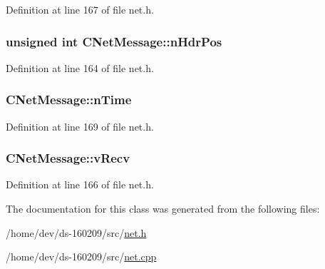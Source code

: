 Definition at line 167 of file net.\+h.

\hypertarget{class_c_net_message_a1a500121037490eec4b238906f3a23ad}{}
\subsubsection[{n\+Hdr\+Pos}]{\setlength{\rightskip}{0pt plus 5cm}unsigned int C\+Net\+Message\+::n\+Hdr\+Pos}\label{class_c_net_message_a1a500121037490eec4b238906f3a23ad}


Definition at line 164 of file net.\+h.

\hypertarget{class_c_net_message_a99d5bbca862ac4b7a88b71a7b679decc}{}
\subsubsection[{n\+Time}]{ C\+Net\+Message\+::n\+Time}\label{class_c_net_message_a99d5bbca862ac4b7a88b71a7b679decc}


Definition at line 169 of file net.\+h.

\hypertarget{class_c_net_message_a1a25c16099d01362e1663390a2e06d1a}{}
\subsubsection[{v\+Recv}]{ C\+Net\+Message\+::v\+Recv}\label{class_c_net_message_a1a25c16099d01362e1663390a2e06d1a}


Definition at line 166 of file net.\+h.



The documentation for this class was generated from the following files\+:\begin{DoxyCompactItemize}
\item 
/home/dev/ds-\/160209/src/\hyperlink{net_8h}{net.\+h}\item 
/home/dev/ds-\/160209/src/\hyperlink{net_8cpp}{net.\+cpp}\end{DoxyCompactItemize}
